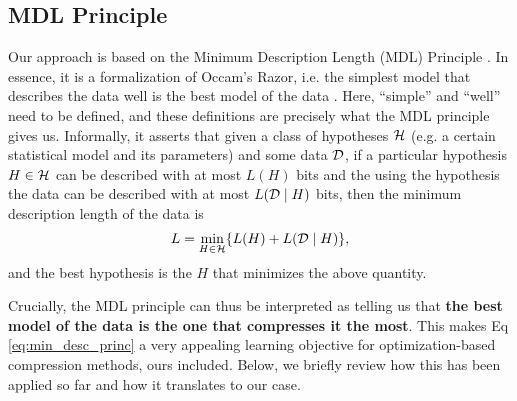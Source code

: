 \subsection{MDL Principle} 
\label{sec:mdl}
Our approach is based on the Minimum Description Length (MDL) Principle
\cite{rissanen1986stochastic}. In essence, it is a formalization of Occam's
Razor, i.e. the simplest model that describes the data well is the best model of
the data \cite{grünwald2007minimum}. Here, ``simple'' and ``well'' need to be
defined, and these definitions are precisely what the MDL principle gives us.
Informally, it asserts that given a class of hypotheses $\mathcal{H}$ (e.g. a certain
statistical model and its parameters) and some data $\mathcal{D}$, if a particular
hypothesis $H \in \mathcal{H}$ can be described with at most $L(H)$ bits and the using the
hypothesis the data can be described with at most $L(\mathcal{D} \mid H)$ bits, then the
minimum description length of the data is
\begin{equation}
\label{eq:min_desc_princ}
  L = \min_{H \in \mathcal{H}}\{ L(H) + L(\mathcal{D} \mid H) \},
\end{equation}
and the best hypothesis is the $H$ that minimizes the above quantity.
\par
Crucially, the MDL principle can thus be interpreted as telling us that
\textbf{the best model of the data is the one that compresses it the most}.
This makes Eq \ref{eq:min_desc_princ} a very appealing learning objective for
optimization-based compression methods, ours included.
Below, we briefly review how this has been applied so far and how it translates
to our case.
